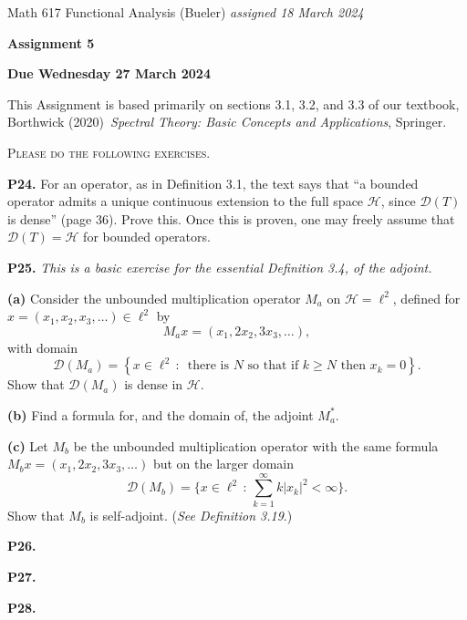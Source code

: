 \documentclass[12pt]{amsart}
\newcommand{\cD}{\mathcal{D}}
\newcommand{\cH}{\mathcal{H}}
\newcommand{\prob}[1]{\bigskip\noindent\textbf{#1.}\quad }
\newcommand{\epart}[1]{\medskip\noindent\textbf{(#1)}\quad }
\begin{document}
\scriptsize \noindent Math 617 Functional Analysis (Bueler) \hfill \emph{assigned 18 March 2024}
\normalsize\medskip

\Large\centerline{\textbf{Assignment 5}}
\large
\medskip

\centerline{\textbf{Due Wednesday 27 March 2024}}
\medskip
\normalsize

\thispagestyle{empty}

\bigskip
\noindent This Assignment is based primarily on sections 3.1, 3.2, and 3.3 of our textbook, Borthwick (2020)~\emph{Spectral Theory: Basic Concepts and Applications}, Springer.

\medskip
\noindent \textsc{Please do the following exercises.}
\smallskip


\prob{P24}  For an operator, as in Definition 3.1, the text says that ``a bounded operator admits a unique continuous extension to the full space $\cH$, since $\cD(T)$ is dense'' (page 36).  Prove this.  Once this is proven, one may freely assume that $\cD(T) = \cH$ for bounded operators.


\prob{P25}  \emph{This is a basic exercise for the essential Definition 3.4, of the adjoint.}

\epart{a} Consider the unbounded multiplication operator $M_a$ on $\cH=\ell^2$, defined for $x=(x_1,x_2,x_3,\dots) \in \ell^2$ by
	$$M_a x = (x_1, 2 x_2, 3 x_3, \dots),$$
with domain
	$$\cD(M_a) = \left\{x \in \ell^2\,:\,\text{ there is $N$ so that if $k\ge N$ then } x_k=0\right\}.$$
Show that $\cD(M_a)$ is dense in $\cH$.

\epart{b} Find a formula for, and the domain of, the adjoint $M_a^*$.

\epart{c} Let $M_b$ be the unbounded multiplication operator with the same formula $M_b x = (x_1, 2 x_2, 3 x_3, \dots)$ but on the larger domain
    $$\cD(M_b) = \Big\{x \in \ell^2\,:\, \sum_{k=1}^\infty k|x_k|^2 < \infty\Big\}.$$
Show that $M_b$ is self-adjoint.  (\emph{See Definition 3.19}.)


\prob{P26}  


\prob{P27}  


\prob{P28}  
\end{document}
